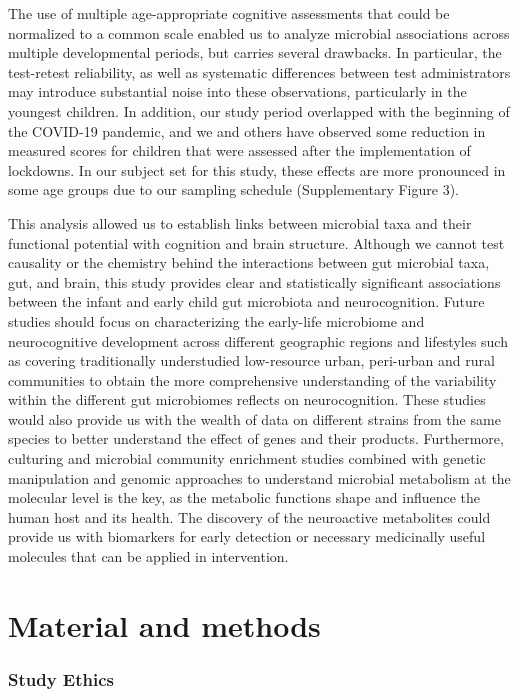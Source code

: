 \documentclass{article}
\begin{document}
The use of multiple age-appropriate cognitive assessments that could be
normalized to a common scale enabled us to analyze microbial
associations across multiple developmental periods, but carries several
drawbacks. In particular, the test-retest reliability, as well as
systematic differences between test administrators may introduce
substantial noise into these observations, particularly in the youngest
children. In addition, our study period overlapped with the beginning of
the COVID-19 pandemic, and we and others have observed some reduction in
measured scores for children that were assessed after the implementation
of lockdowns. In our subject set for this study, these effects are more
pronounced in some age groups due to our sampling schedule
\cite{blackwellYouthWellbeingCOVID192022,deoniImpactCOVID19Pandemic2021}
(Supplementary Figure 3).

This analysis allowed us to establish links between microbial taxa and
their functional potential with cognition and brain structure. Although
we cannot test causality or the chemistry behind the interactions
between gut microbial taxa, gut, and brain, this study provides clear
and statistically significant associations between the infant and early
child gut microbiota and neurocognition. Future studies should focus on
characterizing the early-life microbiome and neurocognitive development
across different geographic regions and lifestyles such as covering
traditionally understudied low-resource urban, peri-urban and rural
communities to obtain the more comprehensive understanding of the
variability within the different gut microbiomes reflects on
neurocognition. These studies would also provide us with the wealth of
data on different strains from the same species to better understand the
effect of genes and their products. Furthermore, culturing and microbial
community enrichment studies combined with genetic manipulation and
genomic approaches to understand microbial metabolism at the molecular
level is the key, as the metabolic functions shape and influence the
human host and its health. The discovery of the neuroactive metabolites
could provide us with biomarkers for early detection or necessary
medicinally useful molecules that can be applied in intervention.

\section*{Material and methods}

\subsubsection*{Study Ethics}
\end{document}
